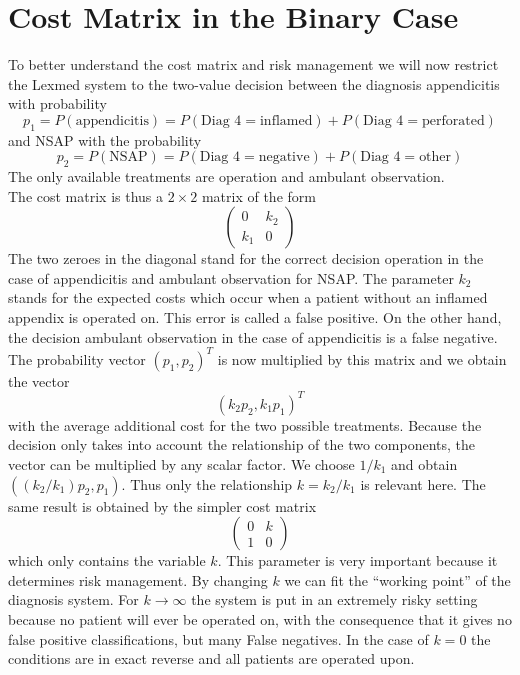 \documentclass[10pt]{book}
\begin{document}
\section{Cost Matrix in the Binary Case}
To better understand the cost matrix and risk management we will now restrict the Lexmed system to the two-value decision between the diagnosis appendicitis with probability
$$
p_{1}=P(\text{appendicitis})=P(\text{Diag }4=\text{inflamed})+P(\text{Diag }4=\text{perforated})
$$
and NSAP with the probability
$$
p_{2}=P(\text{NSAP})=P(\text{Diag }4=\text{negative})+P(\text{Diag }4=\text{other})
$$
The only available treatments are operation and ambulant observation.\\
The cost matrix is thus a $2 \times 2$ matrix of the form
$$
\left(\begin{array}{cc}
0 & k_{2} \\
k_{1} & 0
\end{array}\right)
$$
The two zeroes in the diagonal stand for the correct decision operation in the case of appendicitis and ambulant observation for NSAP. The parameter $k_{2}$ stands for the expected costs which occur when a patient without an inflamed appendix is operated on. This error is called a false positive. On the other hand, the decision ambulant observation in the case of appendicitis is a false negative. The probability vector $\left(p_{1}, p_{2}\right)^{T}$ is now multiplied by this matrix and we obtain the vector
$$
\left(k_{2} p_{2}, k_{1} p_{1}\right)^{T}
$$
with the average additional cost for the two possible treatments. Because the decision only takes into account the relationship of the two components, the vector can be multiplied by any scalar factor. We choose $1 / k_{1}$ and obtain $\left(\left(k_{2} / k_{1}\right) p_{2}, p_{1}\right)$. Thus only the relationship $k=k_{2} / k_{1}$ is relevant here. The same result is obtained by the simpler cost matrix
$$
\left(\begin{array}{ll}
0 & k \\
1 & 0
\end{array}\right)
$$
which only contains the variable $k$. This parameter is very important because it determines risk management. By changing $k$ we can fit the ``working point'' of the diagnosis system. For $k \rightarrow \infty$ the system is put in an extremely risky setting because no patient will ever be operated on, with the consequence that it gives no false positive classifications, but many False negatives. In the case of $k=0$ the conditions are in exact reverse and all patients are operated upon.
\end{document}
